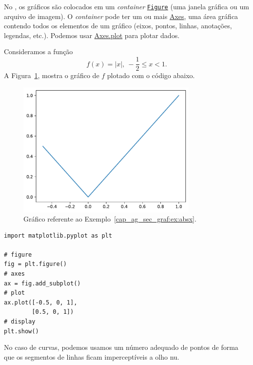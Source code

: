 No {\matplotlib}, os gráficos são colocados em um \textit{container} \href{https://matplotlib.org/stable/api/figure_api.html#matplotlib.figure.Figure}{\lstinline+Figure+} (uma janela gráfica ou um arquivo de imagem). O \textit{container} pode ter um ou mais \href{https://matplotlib.org/stable/api/_as_gen/matplotlib.axes.Axes.html#matplotlib.axes.Axes}{Axes}, uma área gráfica contendo todos os elementos de um gráfico (eixos, pontos, linhas, anotações, legendas, etc.). Podemos usar \href{https://matplotlib.org/stable/api/_as_gen/matplotlib.axes.Axes.plot.html#matplotlib.axes.Axes.plot}{Axes.plot} para plotar dados.

\begin{ex}\label{cap_ag_sec_graf:ex:fig_absx}
  Consideramos a função
  \begin{equation}
    f(x) = |x|, ~-\frac{1}{2}\leq x < 1.
  \end{equation}
  A Figura~\ref{cap_ag_sec_graf:fig:absx}, mostra o gráfico de $f$ plotado com o código abaixo.

  \begin{figure}[H]
    \centering
    \includegraphics[width=0.8\textwidth]{./cap_ag/dados/fig_absx/fig}
    \caption{Gráfico referente ao Exemplo~\ref{cap_ag_sec_graf:ex:absx}.}
    \label{cap_ag_sec_graf:fig:absx}
  \end{figure}
  
\begin{lstlisting}
import matplotlib.pyplot as plt

# figure
fig = plt.figure()
# axes
ax = fig.add_subplot()
# plot
ax.plot([-0.5, 0, 1],
        [0.5, 0, 1])
# display
plt.show()
\end{lstlisting}
\end{ex}

No caso de curvas, podemos usamos um número adequado de pontos de forma que os segmentos de linhas ficam imperceptíveis a olho nu.

